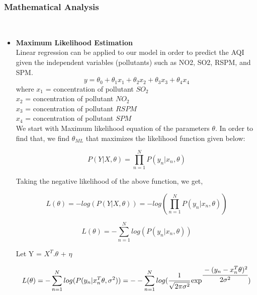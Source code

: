 \documentclass{article}
\begin{document}
\subsubsection {\color{brown}
\textbf{Mathematical Analysis}} \\ 
\begin{itemize}
    \item 
  \textbf{Maximum Likelihood Estimation} \\
    Linear regression can be applied to our model in order to predict the AQI given the independent variables (pollutants) such as NO2, SO2, RSPM, and SPM.  
    \begin{equation*}
    y = \theta_{0} + \theta_{1}x_{1} + \theta_{2}x_{2} + \theta_{3}x_{3} + \theta_{4}x_{4} 
    \end{equation*}
    where $x_{1}$ = concentration of pollutant $SO_{2}$ \\
    $x_{2}$ = concentration of pollutant $NO_{2}$ \\
    $x_{3}$ = concentration of pollutant $RSPM$ \\
    $x_{4}$ = concentration of pollutant $SPM$ \\
    
    We start with Maximum likelihood equation of the parameters $\theta$. In order to find that, we find $\theta_{ML}$ that maximizes the likelihood function given below: 
    
    \begin{equation*}
    P(Y | X, \theta) = \prod_{n=1}^{N} P(y_{n} | x_{n}, \theta)
    \end{equation*}
    
    Taking the negative likelihood of the above function, we get, 
    
    \begin{equation*}
    L(\theta) = -log(P(Y | X, \theta)) = -log(\prod_{n=1}^{N} P(y_{n} | x_{n}, \theta))
    \end{equation*}
    
    \begin{equation*}
    L(\theta) = -\sum_{n=1}^{N} log( P(y_{n} | x_{n}, \theta))
    \end{equation*}
    
    Let Y = $X^T.\theta$ + $\eta$
    
     \begin{equation*}
    L(\theta) = -\sum_{n=1}^{N} log( P(y_{n} | x_{n}^T \theta, \sigma^2))  = --\sum_{n=1}^{N}  log ( \cfrac{1}{\sqrt{2\pi\sigma^2}} \exp^{\cfrac{-(y_n - x_n^T\theta)^2}{2\sigma^2}})
    \end{equation*}
    

\end{itemize}
\end{document}
